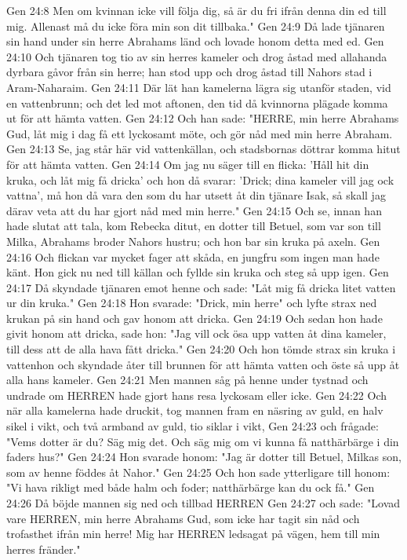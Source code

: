 Gen 24:8  Men om kvinnan icke vill följa dig, så är du fri ifrån denna din ed till mig. Allenast må du icke föra min son dit tillbaka."
Gen 24:9  Då lade tjänaren sin hand under sin herre Abrahams länd och lovade honom detta med ed.
Gen 24:10  Och tjänaren tog tio av sin herres kameler och drog åstad med allahanda dyrbara gåvor från sin herre; han stod upp och drog åstad till Nahors stad i Aram-Naharaim.
Gen 24:11  Där lät han kamelerna lägra sig utanför staden, vid en vattenbrunn; och det led mot aftonen, den tid då kvinnorna plägade komma ut för att hämta vatten.
Gen 24:12  Och han sade: "HERRE, min herre Abrahams Gud, låt mig i dag få ett lyckosamt möte, och gör nåd med min herre Abraham.
Gen 24:13  Se, jag står här vid vattenkällan, och stadsbornas döttrar komma hitut för att hämta vatten.
Gen 24:14  Om jag nu säger till en flicka: 'Håll hit din kruka, och låt mig få dricka' och hon då svarar: 'Drick; dina kameler vill jag ock vattna', må hon då vara den som du har utsett åt din tjänare Isak, så skall jag därav veta att du har gjort nåd med min herre."
Gen 24:15  Och se, innan han hade slutat att tala, kom Rebecka ditut, en dotter till Betuel, som var son till Milka, Abrahams broder Nahors hustru; och hon bar sin kruka på axeln.
Gen 24:16  Och flickan var mycket fager att skåda, en jungfru som ingen man hade känt. Hon gick nu ned till källan och fyllde sin kruka och steg så upp igen.
Gen 24:17  Då skyndade tjänaren emot henne och sade: "Låt mig få dricka litet vatten ur din kruka."
Gen 24:18  Hon svarade: "Drick, min herre" och lyfte strax ned krukan på sin hand och gav honom att dricka.
Gen 24:19  Och sedan hon hade givit honom att dricka, sade hon: "Jag vill ock ösa upp vatten åt dina kameler, till dess att de alla hava fått dricka."
Gen 24:20  Och hon tömde strax sin kruka i vattenhon och skyndade åter till brunnen för att hämta vatten och öste så upp åt alla hans kameler.
Gen 24:21  Men mannen såg på henne under tystnad och undrade om HERREN hade gjort hans resa lyckosam eller icke.
Gen 24:22  Och när alla kamelerna hade druckit, tog mannen fram en näsring av guld, en halv sikel i vikt, och två armband av guld, tio siklar i vikt,
Gen 24:23  och frågade: "Vems dotter är du? Säg mig det. Och säg mig om vi kunna få natthärbärge i din faders hus?"
Gen 24:24  Hon svarade honom: "Jag är dotter till Betuel, Milkas son, som av henne föddes åt Nahor."
Gen 24:25  Och hon sade ytterligare till honom: "Vi hava rikligt med både halm och foder; natthärbärge kan du ock få."
Gen 24:26  Då böjde mannen sig ned och tillbad HERREN
Gen 24:27  och sade: "Lovad vare HERREN, min herre Abrahams Gud, som icke har tagit sin nåd och trofasthet ifrån min herre! Mig har HERREN ledsagat på vägen, hem till min herres fränder."
